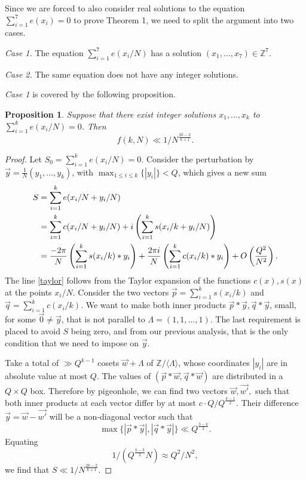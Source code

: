 \documentclass[10pt,a4paper]{amsart}
\newtheorem{proposition}{Proposition}
\newcommand{\Z}{\mathbb{Z}}
\begin{document}
Since we are forced to also consider real solutions to the equation $\sum_{i=1}^7 e(x_i)=0$ to prove Theorem 1, we need to split the argument into two cases.

\textit{Case 1.} The equation $\sum_{i=1}^7 e(x_i/N)$ has a solution $(x_1,\dots,x_7)\in \Z^7$.

\textit{Case 2.} The same equation does not have any integer solutions.

\textit{Case 1} is covered by the following proposition.
\begin{proposition}
    Suppose that there exist integer solutions $x_1,\dots,x_k$ to $\sum_{i=1}^ke(x_i/N)=0$. Then
    $$ f(k,N)\ll 1/N^{\frac{2k-2}{k+1}}  .$$
\end{proposition}
\begin{proof}
    Let $S_0=\sum_{i=1}^k e(x_i/N)=0 $. Consider the perturbation by $\vec{y}=\frac{1}{N}(y_1,\dots,y_k)$, with $\max_{1\leq i\leq k}\{|y_i|\}<Q$, which gives a new sum
    \begin{align}
        S&=\sum_{i=1}^k e(x_i/N+y_i/N)\notag\\
        &=\sum_{i=1}^k c(x_i/N+y_i/N)+i\left(\sum_{i=1}^k s(x_i/k+y_i/N)  \right)\notag\\
        &=\frac{-2\pi}{N}\left( \sum_{i=1}^k s(x_i/k)*y_i \right)+\frac{2\pi i}{N}\left( \sum_{i=1}^kc(x_i/k)*y_i  \right)+O\left( \frac{Q^2}{N^2} \right).\label{taylor}
    \end{align}
    The line \eqref{taylor} follows from the Taylor expansion of the functions $c(x),s(x)$ at the points $x_i/N$. Consider the two vectors $\vec{p}=\sum_{i=1}^k s(x_i/k)$ and $\vec{q}=\sum_{i=1}^k c(x_i/k)$. We want to make both inner products $\vec{p}*\vec{y}, \vec{q}*\vec{y}$, small, for some $\vec{0}\neq\vec{y}$, that is not parallel to $\Lambda=(1,1,\dots,1)$. The last requirement is placed to avoid $S$ being zero, and from our previous analysis, that is the only condition that we need to impose on $\vec{y}.$

    Take a total of $\gg Q^{k-1}$ cosets $\vec{w}+\Lambda$ of $\Z/\langle \Lambda \rangle$, whose coordinates $|y_i|$ are in absolute value at most $Q$. The values of $(\vec{p}*\vec{w},\vec{q}*\vec{w})$ are distributed in a $Q\times Q$ box. Therefore by pigeonhole, we can find two vectors $\vec{w},\vec{w'},$ such that both inner products at each vector differ by at most $c\cdot Q/Q^{\frac{k-1}{2}}.$ Their difference $\vec{y}=\vec{w}-\vec{w'}$ will be a non-diagonal vector such that
    $$  \max\{ |\vec{p}*\vec{y}|, |\vec{q}*\vec{y}|  \}\ll Q^{\frac{3-k}{2}}.  $$
    Equating 
    $$  1/(Q^{\frac{k-3}{2}}N)\approx Q^2/N^2,  $$
    we find that $S\ll 1/N^{\frac{2k-2}{k+1}}. $
\end{proof}
\end{document}
